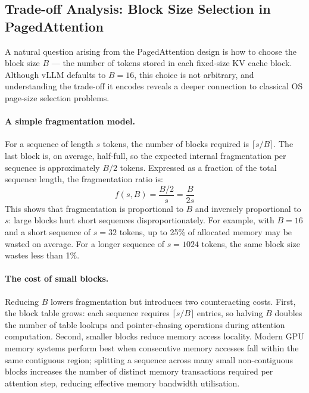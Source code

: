 \documentclass[10pt, a4paper]{article}
\begin{document}
\subsection{Trade-off Analysis: Block Size Selection in PagedAttention}

A natural question arising from the PagedAttention design is how to
choose the block size $B$ --- the number of tokens stored in each
fixed-size KV cache block.
Although vLLM defaults to $B = 16$, this choice is not arbitrary, and
understanding the trade-off it encodes reveals a deeper connection to
classical OS page-size selection problems.

\paragraph{A simple fragmentation model.}
For a sequence of length $s$ tokens, the number of blocks required is
$\lceil s / B \rceil$.
The last block is, on average, half-full, so the expected internal
fragmentation per sequence is approximately $B/2$ tokens.
Expressed as a fraction of the total sequence length, the fragmentation
ratio is:
\begin{equation}
    f(s, B) = \frac{B/2}{s} = \frac{B}{2s}
    \label{eq:frag}
\end{equation}
This shows that fragmentation is proportional to $B$ and inversely
proportional to $s$: large blocks hurt short sequences disproportionately.
For example, with $B = 16$ and a short sequence of $s = 32$ tokens,
up to 25\% of allocated memory may be wasted on average.
For a longer sequence of $s = 1024$ tokens, the same block size wastes
less than 1\%.

\paragraph{The cost of small blocks.}
Reducing $B$ lowers fragmentation but introduces two counteracting costs.
First, the block table grows: each sequence requires
$\lceil s / B \rceil$ entries, so halving $B$ doubles the number of
table lookups and pointer-chasing operations during attention computation.
Second, smaller blocks reduce memory access locality.
Modern GPU memory systems perform best when consecutive memory accesses
fall within the same contiguous region; splitting a sequence across many
small non-contiguous blocks increases the number of distinct memory
transactions required per attention step, reducing effective memory
bandwidth utilisation.
\end{document}
